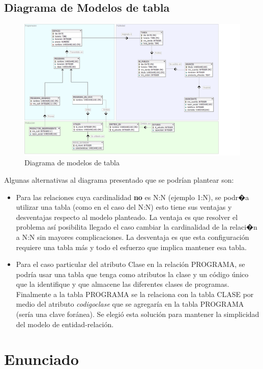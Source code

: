 \documentclass[a4paper,10pt]{article}
\begin{document}
  \subsection{Diagrama de Modelos de tabla}  
		\begin{figure}[H]
			\begin{center}
				\includegraphics[scale=0.35]{der.png}
				\caption{Diagrama de modelos de tabla}
				\label{fig:flujos}
			\end{center}
		\end{figure}
		
		\begin{flushleft}
    	Algunas alternativas al diagrama presentado que se podr\'ian plantear son:
    \end{flushleft}  
    
    \begin{itemize}
    	\item Para las relaciones cuya cardinalidad \textbf{no} es N:N (ejemplo 1:N), se podr�a utilizar una tabla (como en el caso del N:N) esto tiene sus ventajas y desventajas respecto al modelo planteado. La ventaja es que resolver el problema as\'i posibilita llegado el caso cambiar la cardinalidad de la relaci�n a N:N sin mayores complicaciones. La desventaja es que esta configuraci\'on requiere una tabla m\'as y todo el esfuerzo que implica mantener esa tabla.
    	\item Para el caso particular del atributo Clase en la relaci\'on PROGRAMA, se podr\'ia usar una tabla que tenga como atributos la clase y un c\'odigo \'unico que la identifique y que almacene las diferentes clases de programas. Finalmente a la tabla PROGRAMA se la relaciona con la tabla CLASE por medio del atributo \textit{codigoclase} que se agregar\'ia en la tabla PROGRAMA (ser\'ia una clave for\'anea).
    	Se elegi\'o esta soluci\'on para mantener la simplicidad del modelo de entidad-relaci\'on.
    \end{itemize}
    
\appendix
\newpage
\section{Enunciado}
  
\end{document}
